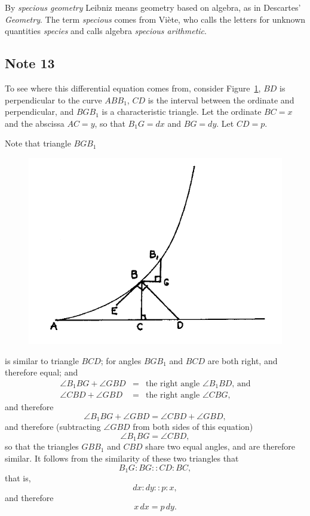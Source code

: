 \documentclass[twoside,openright]{article}
\begin{document}
By {\em specious geometry} Leibniz means geometry based on algebra, as
in Descartes' {\em Geometry}.  The term {\em specious} comes from
Vi\`{e}te, who calls the letters for unknown quantities {\em species}
and calls algebra {\em specious arithmetic}.

\subsection*{Note 13}
\label{crg13}
To see where this differential equation comes from, consider
Figure~\ref{barrow1A}, $BD$ is perpendicular to the curve $ABB_1$,
$CD$ is the interval between the ordinate and perpendicular, and
$BGB_1$ is a characteristic triangle.  Let the ordinate $BC = x$ and
the abscissa $AC = y$, so that $B_1G =dx$ and $BG = dy$.  Let
$CD = p$.

Note that triangle $BGB_1$ 
\begin{figure}[htp]
\begin{center}
\includegraphics[width=.75\textwidth]{fig/Figure40}
\caption{}
\label{barrow1A}
\end{center}
\end{figure}
is similar to triangle $BCD$; for angles $BGB_1$ and $BCD$ are both right, and therefore equal; and 
\begin{eqnarray*}
\angle B_1BG + \angle GBD & = & \mbox{the right angle } \angle B_1BD \mbox{, and}\\
\angle CBD + \angle GBD & = &  \mbox{the right angle } \angle CBG,
\end{eqnarray*}
and therefore 
$$\angle B_1BG + \angle GBD = \angle CBD + \angle GBD,$$
and therefore (subtracting  $\angle GBD$ from both sides of this equation)
$$\angle B_1BG=  \angle CBD,$$
so that the triangles $GBB_1$ and $CBD$ share two equal angles, and
are therefore similar.  It follows from the similarity of these two
triangles that
$$B_1G\!:\! BG :: CD \!:\! BC,$$
that is,
$$dx\!:\!dy :: p\!:\!x,$$
and therefore 
$$x\,dx = p\,dy.$$
\end{document}
